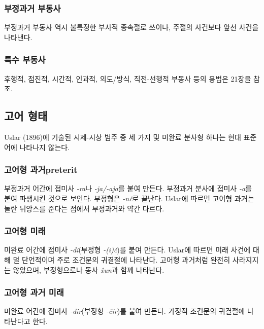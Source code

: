 \subsubsection{부정과거 부동사}
부정과거 부동사 역시 불특정한 부사적 종속절로 쓰이나, 주절의 사건보다 앞선 사건을 나타낸다.
\subsubsection{특수 부동사}
후행적, 점진적, 시간적, 인과적, 의도/방식, 직전-선행적 부동사 등의 용법은 21장을 참조.
\subsection{고어 형태}
Uslar (1896)에 기술된 시제-시상 범주 중 세 가지 및 미완료 분사형 하나는 현대 표준어에 나타나지 않는다.
\subsubsection{고어형 과거preterit}
부정과거 어간에 접미사 \textit{-ra}나 \textit{-ja/-aja}를 붙여 만든다. 부정과거 분사에 접미사 \textit{-a}를 붙여 파생시킨 것으로 보인다. 부정형은 \textit{-nč}로 끝난다. Uslar에 따르면 고어형 과거는 놀란 뉘앙스를 준다는 점에서 부정과거와 약간 다르다.
\subsubsection{고어형 미래}
미완료 어간에 접미사 \textit{-di}(부정형 \textit{-(i)č})를 붙여 만든다. Uslar에 따르면 미래 사건에 대해 덜 단언적이며 주로 조건문의 귀결절에 나타난다. 고어형 과거처럼 완전히 사라지지는 않았으며, 부정형으로나 동사 \textit{x̂un}과 함께 나타난다. 
\subsubsection{고어형 과거 미래}
미완료 어간에 접미사 \textit{-dir}(부정형 \textit{-čir})를 붙여 만든다. 가정적 조건문의 귀결절에 나타난다고 한다.
